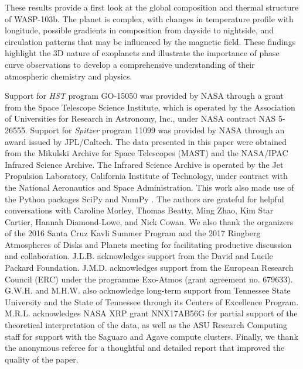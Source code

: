 \documentclass[twocolumn, trackchanges]{aastex61}
\begin{document}
These results provide a first look at the global composition and thermal structure of WASP-103b.  The planet is complex, with changes in temperature profile with longitude, possible gradients in composition from dayside to nightside, and circulation patterns that may be influenced by the magnetic field. These findings highlight the 3D nature of exoplanets and illustrate the importance of phase curve observations to develop a comprehensive understanding of their atmospheric chemistry and physics.  



\acknowledgments
Support for \textit{HST} program GO-15050 was provided by NASA through a grant
from the Space Telescope Science Institute, which is operated by the Association
of Universities for Research in Astronomy, Inc., under NASA contract NAS
5-26555. Support for \textit{Spitzer} program 11099 was provided by NASA through
an award issued by JPL/Caltech.  The data presented in this paper were obtained
from the Mikulski Archive for Space Telescopes (MAST) and the NASA/IPAC Infrared
Science Archive. The Infrared Science Archive is operated by the Jet Propulsion
Laboratory, California Institute of Technology, under contract with the National
Aeronautics and Space Administration.  This work also made use of the Python
packages  SciPy and NumPy \citep{jones_scipy_2001, van2011numpy}. The authors
are grateful for helpful conversations with Caroline Morley, Thomas Beatty, Ming
Zhao, Kim Star Cartier, Hannah Diamond-Lowe, and Nick Cowan. We also thank the
organizers of the 2016 Santa Cruz Kavli Summer Program and the 2017 Ringberg
Atmospheres of Disks and Planets meeting for facilitating productive discussion
and collaboration.  J.L.B. acknowledges support from the David and Lucile
Packard Foundation.  J.M.D. acknowledges support from the European Research
Council (ERC) under the programme Exo-Atmos (grant agreement no. 679633). G.W.H.
and M.H.W. also acknowledge long-term support from Tennessee State University
and the State of Tennessee through its Centers of Excellence Program. M.R.L.
acknowledges NASA XRP grant NNX17AB56G for partial support of the theoretical
interpretation of the data, as well as the ASU Research Computing staff for
support with the Saguaro and Agave compute clusters. Finally, we thank the
anonymous referee for a thoughtful and detailed report that improved the quality of the
paper.
\end{document}
